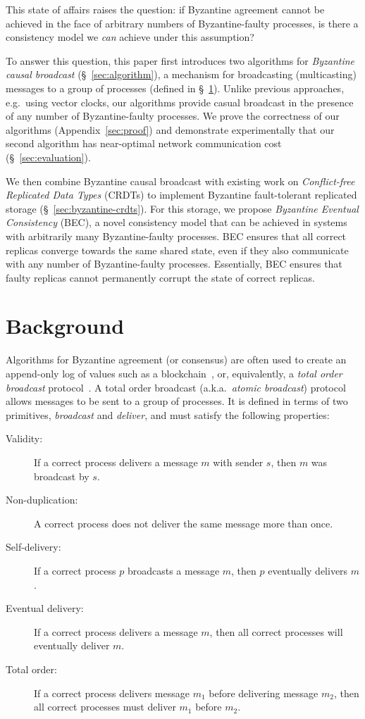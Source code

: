 \documentclass[a4paper,anonymous,USenglish]{lipics-v2019}
\begin{document}
This state of affairs raises the question: if Byzantine agreement cannot be achieved in the face of arbitrary numbers of Byzantine-faulty processes, is there a consistency model we \emph{can} achieve under this assumption?

To answer this question, this paper first introduces two algorithms for \emph{Byzantine causal broadcast} (\S~\ref{sec:algorithm}), a mechanism for broadcasting (multicasting) messages to a group of processes (defined in \S~\ref{sec:background}).
Unlike previous approaches, e.g.\ using vector clocks, our algorithms provide casual broadcast in the presence of any number of Byzantine-faulty processes.
We prove the correctness of our algorithms (Appendix~\ref{sec:proof}) and demonstrate experimentally that our second algorithm has near-optimal network communication cost (\S~\ref{sec:evaluation}).

We then combine Byzantine causal broadcast with existing work on \emph{Conflict-free Replicated Data Types} (CRDTs) to implement Byzantine fault-tolerant replicated storage  (\S~\ref{sec:byzantine-crdts}).
For this storage, we propose \emph{Byzantine Eventual Consistency} (BEC), a novel consistency model that can be achieved in systems with arbitrarily many Byzantine-faulty processes.
BEC ensures that all correct replicas converge towards the same shared state, even if they also communicate with any number of Byzantine-faulty processes.
Essentially, BEC ensures that faulty replicas cannot permanently corrupt the state of correct replicas.

\section{Background}\label{sec:background}

Algorithms for Byzantine agreement (or consensus) are often used to create an append-only log of values such as a blockchain~\cite{Bano:2019}, or, equivalently, a \emph{total order broadcast} protocol~\cite{Cachin:2011wt,Defago:2004ji}.
A total order broadcast (a.k.a.\ \emph{atomic broadcast}) protocol allows messages to be sent to a group of processes.
It is defined in terms of two primitives, \emph{broadcast} and \emph{deliver}, and must satisfy the following properties:

\begin{description}
\item[Validity:] If a correct process delivers a message $m$ with sender $s$, then $m$ was broadcast by $s$.
\item[Non-duplication:] A correct process does not deliver the same message more than once.
\item[Self-delivery:] If a correct process $p$ broadcasts a message $m$, then $p$ eventually delivers $m$.
\item[Eventual delivery:] If a correct process delivers a message $m$, then all correct processes will eventually deliver $m$.
\item[Total order:] If a correct process delivers message $m_1$ before delivering message $m_2$, then all correct processes must deliver $m_1$ before $m_2$.
\end{description}
\end{document}
